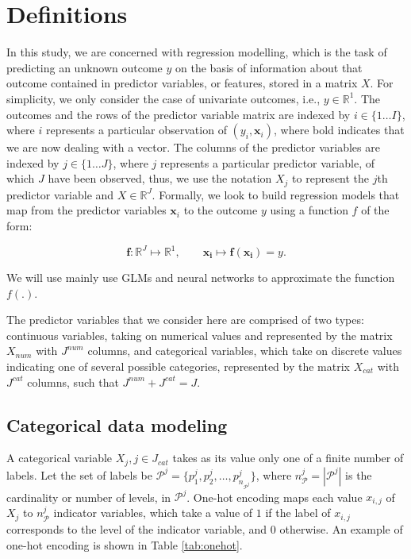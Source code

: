 \documentclass{article}
\begin{document}
\hypertarget{defns}{%
\section{Definitions}\label{defns}}

In this study, we are concerned with regression modelling, which is the
task of predicting an unknown outcome \(y\) on the basis of information
about that outcome contained in predictor variables, or features, stored
in a matrix \(X\). For simplicity, we only consider the case of
univariate outcomes, i.e., \(y \in \mathbb{R}^1\). The outcomes and the
rows of the predictor variable matrix are indexed by
\(i \in \{1 \dots I\}\), where \(i\) represents a particular observation
of \((y_i, \mathbf{x}_i)\), where bold indicates that we are now dealing
with a vector. The columns of the predictor variables are indexed by
\(j \in \{1 \dots J\}\), where \(j\) represents a particular predictor
variable, of which \(J\) have been observed, thus, we use the notation
\(X_j\) to represent the \(j\)th predictor variable and
\(X \in \mathbb{R}^J\). Formally, we look to build regression models
that map from the predictor variables \(\mathbf{x}_i\) to the outcome
\(y\) using a function \(f\) of the form:

\[
\mathbf{f} : \mathbb{R}^J \mapsto \mathbb{R}^1, \quad \quad \mathbf{x_i} \mapsto  \mathbf f{(\mathbf{x_i})} = y. 
\]

We will use mainly use GLMs and neural networks to approximate the
function \(f(.)\).

The predictor variables that we consider here are comprised of two
types: continuous variables, taking on numerical values and represented
by the matrix \(X_{num}\) with \(J^{num}\) columns, and categorical
variables, which take on discrete values indicating one of several
possible categories, represented by the matrix \(X_{cat}\) with
\(J^{cat}\) columns, such that \(J^{num} + J^{cat} = J\).

\hypertarget{categorical-data-modeling}{%
\subsection{Categorical data modeling}\label{categorical-data-modeling}}

A categorical variable \(X_j, j \in J_{cat}\) takes as its value only
one of a finite number of labels. Let the set of labels be
\(\mathcal{P}^j = \{p^j_1, p^j_2,\dots, p^j_{n_{\mathcal{P}^j}} \}\),
where \(n_\mathcal{P}^j = |\mathcal{P}^j|\) is the cardinality or number
of levels, in \(\mathcal{P}^j\). One-hot encoding maps each value
\(x_{i,j}\) of \(X_j\) to \(n_\mathcal{P}^j\) indicator variables, which
take a value of \(1\) if the label of \(x_{i,j}\) corresponds to the
level of the indicator variable, and \(0\) otherwise. An example of
one-hot encoding is shown in Table \ref{tab:onehot}.
\end{document}
